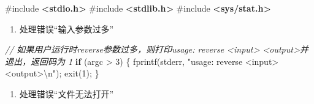 \documentclass{article}
\newenvironment{Shaded}{}{}
\newcommand{\CommentTok}[1]{\textcolor[rgb]{0.38,0.63,0.69}{\textit{#1}}}
\newcommand{\ControlFlowTok}[1]{\textcolor[rgb]{0.00,0.44,0.13}{\textbf{#1}}}
\newcommand{\DecValTok}[1]{\textcolor[rgb]{0.25,0.63,0.44}{#1}}
\newcommand{\ImportTok}[1]{\textcolor[rgb]{0.00,0.50,0.00}{\textbf{#1}}}
\newcommand{\NormalTok}[1]{#1}
\newcommand{\OperatorTok}[1]{\textcolor[rgb]{0.40,0.40,0.40}{#1}}
\newcommand{\PreprocessorTok}[1]{\textcolor[rgb]{0.74,0.48,0.00}{#1}}
\newcommand{\SpecialCharTok}[1]{\textcolor[rgb]{0.25,0.44,0.63}{#1}}
\newcommand{\StringTok}[1]{\textcolor[rgb]{0.25,0.44,0.63}{#1}}
\begin{document}
\begin{Shaded}
  \begin{Highlighting}[]
    \PreprocessorTok{\#include }\ImportTok{\textless{}stdio.h\textgreater{}}
    \PreprocessorTok{\#include }\ImportTok{\textless{}stdlib.h\textgreater{}}
    \PreprocessorTok{\#include }\ImportTok{\textless{}sys/stat.h\textgreater{}}
  \end{Highlighting}
\end{Shaded}

\begin{enumerate}
  \def\labelenumi{\arabic{enumi}.}
  \item
        处理错误``输入参数过多''
\end{enumerate}

\begin{Shaded}
  \begin{Highlighting}[]
    \CommentTok{// 如果用户运行时reverse参数过多，则打印usage: reverse \textless{}input\textgreater{} \textless{}output\textgreater{}并退出，返回码为 1}
    \ControlFlowTok{if} \OperatorTok{(}\NormalTok{argc }\OperatorTok{\textgreater{}} \DecValTok{3}\OperatorTok{)} \OperatorTok{\{}
    \NormalTok{    fprintf}\OperatorTok{(}\NormalTok{stderr}\OperatorTok{,} \StringTok{"usage: reverse \textless{}input\textgreater{} \textless{}output\textgreater{}}\SpecialCharTok{\textbackslash{}n}\StringTok{"}\OperatorTok{);}
    \NormalTok{    exit}\OperatorTok{(}\DecValTok{1}\OperatorTok{);}
    \OperatorTok{\}}
  \end{Highlighting}
\end{Shaded}

\begin{enumerate}
  \def\labelenumi{\arabic{enumi}.}
  \item
        处理错误``文件无法打开''
\end{enumerate}
\end{document}
